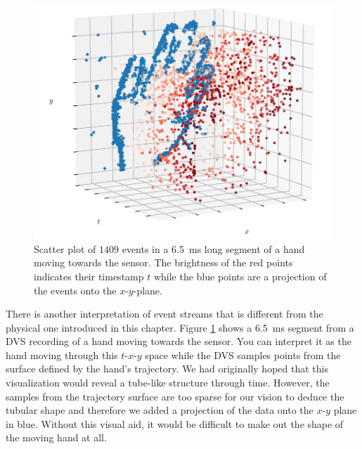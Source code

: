 \begin{figure}
  \centering
  \includegraphics{figures/dvs/hand}
  \caption{Scatter plot of $1409$ events in a \SI{6.5}{\milli\second} long
    segment of a hand moving towards the sensor. The brightness of the red
    points indicates their timestamp $t$ while the blue points are a projection
    of the events onto the $x$-$y$-plane.}
  \label{fig:dvs:hand}
\end{figure}

There is another interpretation of event streams that is different from the
physical one introduced in this chapter. Figure \ref{fig:dvs:hand} shows a
\SI{6.5}{\milli\second} segment from a DVS recording of a hand moving towards
the sensor. You can interpret it as the hand moving through this $t$-$x$-$y$
space while the DVS samples points from the surface defined by the hand's
trajectory. We had originally hoped that this visualization would reveal a
tube-like structure through time. However, the samples from the trajectory
surface are too sparse for our vision to deduce the tubular shape and therefore
we added a projection of the data onto the $x$-$y$ plane in blue. Without this
visual aid, it would be difficult to make out the shape of the moving hand at
all.
